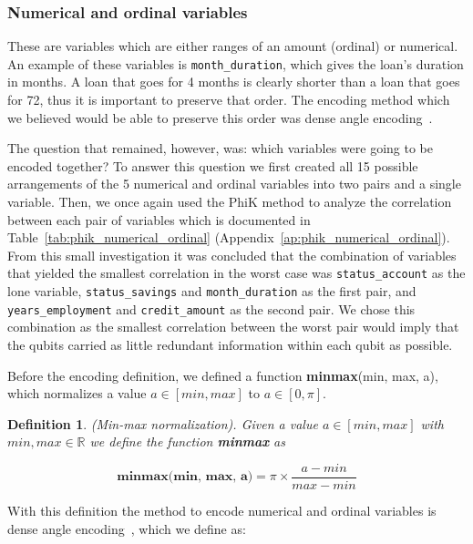\documentclass{ieeeaccess}
\newtheorem{definition}{Definition}[section]
\begin{document}
\subsubsection{Numerical and ordinal variables}

These are variables which are either ranges of an amount (ordinal) or numerical. An example of these variables is \texttt{month\_duration}, which gives the loan's duration in months. A loan that goes for 4 months is clearly shorter than a loan that goes for 72, thus it is important to preserve that order. The encoding method which we believed would be able to preserve this order was dense angle encoding~\cite{ibm_encoding}.

The question that remained, however, was: which variables were going to be encoded together? To answer this question we first created all 15 possible arrangements of the 5 numerical and ordinal variables into two pairs and a single variable. Then, we once again used the PhiK method to analyze the correlation between each pair of variables which is documented in Table~\ref{tab:phik_numerical_ordinal} (Appendix~\ref{ap:phik_numerical_ordinal}). From this small investigation it was concluded that the combination of variables that yielded the smallest correlation in the worst case was \texttt{status\_account} as the lone variable, \texttt{status\_savings} and \texttt{month\_duration} as the first pair, and \texttt{years\_employment} and \texttt{credit\_amount} as the second pair. We chose this combination as the smallest correlation between the worst pair would imply that the qubits carried as little redundant information within each qubit as possible.

Before the encoding definition, we defined a function \textbf{minmax}(min, max, a), which normalizes a value $a \in [min , max]$ to $a \in [0 , \pi ]$. 

\begin{definition}
  (Min-max normalization). Given a value $a \in [min , max]$ with $min, max \in \mathbb{R}$ we define the function \textbf{minmax} as

  \[
    \textbf{minmax(min, max, a)} = \pi \times \frac{a-min}{max-min}
  \]
  \label{def:minmax}
\end{definition}

With this definition the method to encode numerical and ordinal variables is dense angle encoding~\cite{ibm_encoding}, which we define as:
\end{document}
